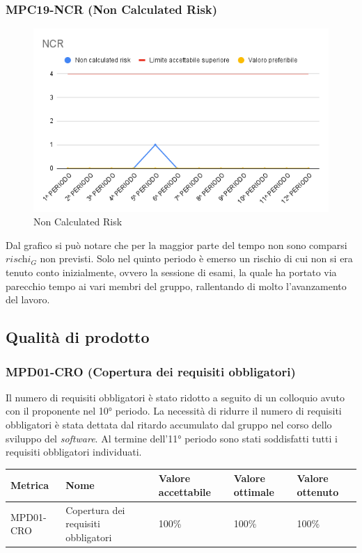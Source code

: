 \subsubsection{MPC19-NCR (Non Calculated Risk)}
\begin{figure}[H]
  \centering
  \includegraphics[width=0.7\linewidth]{grafici/NCR.png}
  \caption{Non Calculated Risk}
\end{figure}
Dal grafico si può notare che per la maggior parte del tempo non sono comparsi $\textit{rischi}_G$ non previsti. Solo nel quinto periodo è emerso un rischio di cui non si era tenuto conto inizialmente, ovvero la sessione di esami, la quale ha portato via parecchio tempo ai vari membri del gruppo, rallentando di molto l'avanzamento del lavoro.
\subsection{Qualità di prodotto}
\subsubsection{MPD01-CRO (Copertura dei requisiti obbligatori)}
Il numero di requisiti obbligatori è stato ridotto a seguito di un colloquio avuto con il proponente nel 10° periodo. La necessità di ridurre il numero di requisiti obbligatori è stata dettata dal ritardo accumulato dal gruppo nel corso dello sviluppo del \textit{software}. Al termine dell'11° periodo sono stati soddisfatti tutti i requisiti obbligatori individuati. 
\begin{center}
    \begin{tabular}{|p{3cm}|p{4cm}|p{3cm}|p{3cm}|p{3cm}|}
    \hline
    \textbf{Metrica} & \textbf{Nome} & \textbf{Valore \newline accettabile} & \textbf{Valore \newline ottimale} & \textbf{Valore \newline ottenuto} \\
    \hline
    MPD01-CRO & Copertura dei requisiti obbligatori & 100\% & 100\% & 100\% \\
    \hline
    \end{tabular}
\end{center}

